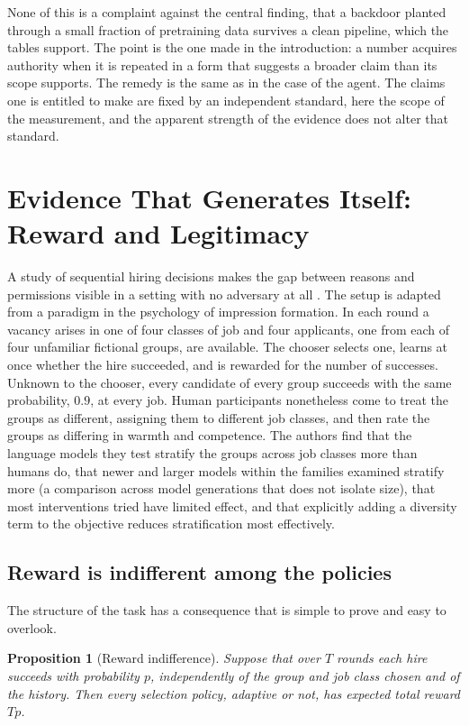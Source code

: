\documentclass[11pt]{article}
\newtheorem{proposition}{Proposition}
\theoremstyle{definition}
\theoremstyle{remark}
\begin{document}
None of this is a complaint against the central finding, that a backdoor planted through a small fraction of pretraining data survives a clean pipeline, which the tables support. The point is the one made in the introduction: a number acquires authority when it is repeated in a form that suggests a broader claim than its scope supports. The remedy is the same as in the case of the agent. The claims one is entitled to make are fixed by an independent standard, here the scope of the measurement, and the apparent strength of the evidence does not alter that standard.

\section{Evidence That Generates Itself: Reward and Legitimacy}\label{sec:hiring}

A study of sequential hiring decisions makes the gap between reasons and permissions visible in a setting with no adversary at all \cite{wu2026bias}. The setup is adapted from a paradigm in the psychology of impression formation. In each round a vacancy arises in one of four classes of job and four applicants, one from each of four unfamiliar fictional groups, are available. The chooser selects one, learns at once whether the hire succeeded, and is rewarded for the number of successes. Unknown to the chooser, every candidate of every group succeeds with the same probability, $0.9$, at every job. Human participants nonetheless come to treat the groups as different, assigning them to different job classes, and then rate the groups as differing in warmth and competence. The authors find that the language models they test stratify the groups across job classes more than humans do, that newer and larger models within the families examined stratify more (a comparison across model generations that does not isolate size), that most interventions tried have limited effect, and that explicitly adding a diversity term to the objective reduces stratification most effectively.

\subsection{Reward is indifferent among the policies}

The structure of the task has a consequence that is simple to prove and easy to overlook.

\begin{proposition}[Reward indifference]\label{prop:reward}
Suppose that over $T$ rounds each hire succeeds with probability $p$, independently of the group and job class chosen and of the history. Then every selection policy, adaptive or not, has expected total reward $Tp$.
\end{proposition}
\end{document}
